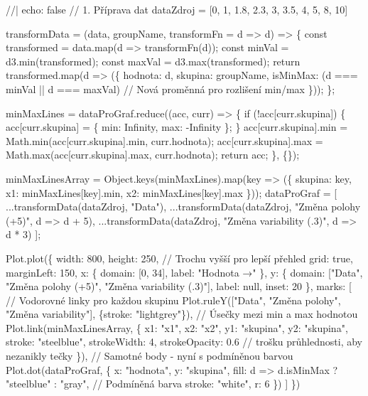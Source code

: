 \documentclass[
  czech,
  11pt,
  letterpaper,
  DIV=11,
  numbers=noendperiod]{scrreprt}
\newenvironment{Shaded}{\begin{snugshade}}{\end{snugshade}}
\newcommand{\NormalTok}[1]{\textcolor[rgb]{0.00,0.23,0.31}{#1}}
\begin{document}
\begin{Shaded}
\begin{Highlighting}[]
\NormalTok{//| echo: false}
\NormalTok{// 1. Příprava dat}
\NormalTok{dataZdroj = [0, 1, 1.8, 2.3, 3, 3.5, 4, 5, 8, 10]}

\NormalTok{transformData = (data, groupName, transformFn = d =\textgreater{} d) =\textgreater{} \{}
\NormalTok{  const transformed = data.map(d =\textgreater{} transformFn(d));}
\NormalTok{  const minVal = d3.min(transformed);}
\NormalTok{  const maxVal = d3.max(transformed);}
\NormalTok{  return transformed.map(d =\textgreater{} (\{ }
\NormalTok{    hodnota: d, }
\NormalTok{    skupina: groupName, }
\NormalTok{    isMinMax: (d === minVal || d === maxVal) // Nová proměnná pro rozlišení min/max}
\NormalTok{  \}));}
\NormalTok{\};}

\NormalTok{minMaxLines = dataProGraf.reduce((acc, curr) =\textgreater{} \{}
\NormalTok{  if (!acc[curr.skupina]) \{}
\NormalTok{    acc[curr.skupina] = \{ min: Infinity, max: {-}Infinity \};}
\NormalTok{  \}}
\NormalTok{  acc[curr.skupina].min = Math.min(acc[curr.skupina].min, curr.hodnota);}
\NormalTok{  acc[curr.skupina].max = Math.max(acc[curr.skupina].max, curr.hodnota);}
\NormalTok{  return acc;}
\NormalTok{\}, \{\});}

\NormalTok{minMaxLinesArray = Object.keys(minMaxLines).map(key =\textgreater{} (\{}
\NormalTok{  skupina: key,}
\NormalTok{  x1: minMaxLines[key].min,}
\NormalTok{  x2: minMaxLines[key].max}
\NormalTok{\}));}
\NormalTok{dataProGraf = [}
\NormalTok{  ...transformData(dataZdroj, "Data"),}
\NormalTok{  ...transformData(dataZdroj, "Změna polohy (+5)", d =\textgreater{} d + 5),}
\NormalTok{  ...transformData(dataZdroj, "Změna variability (.3)", d =\textgreater{} d * 3)}
\NormalTok{];}

\NormalTok{Plot.plot(\{}
\NormalTok{  width: 800,}
\NormalTok{  height: 250, // Trochu vyšší pro lepší přehled}
\NormalTok{  grid: true,}
\NormalTok{  marginLeft: 150, }
\NormalTok{  x: \{ domain: [0, 34], label: "Hodnota →" \},}
\NormalTok{  y: \{ }
\NormalTok{    domain: ["Data", "Změna polohy (+5)", "Změna variability (.3)"],}
\NormalTok{    label: null,}
\NormalTok{    inset: 20 }
\NormalTok{  \},  }
\NormalTok{  marks: [}
\NormalTok{    // Vodorovné linky pro každou skupinu}
\NormalTok{    Plot.ruleY(["Data", "Změna polohy", "Změna variability"], \{stroke: "lightgrey"\}),}
\NormalTok{    // Úsečky mezi min a max hodnotou}
\NormalTok{Plot.link(minMaxLinesArray, \{}
\NormalTok{      x1: "x1", }
\NormalTok{      x2: "x2", }
\NormalTok{      y1: "skupina", }
\NormalTok{      y2: "skupina", }
\NormalTok{      stroke: "steelblue", }
\NormalTok{      strokeWidth: 4,}
\NormalTok{      strokeOpacity: 0.6 // trošku průhlednosti, aby nezanikly tečky}
\NormalTok{    \}),}
\NormalTok{    // Samotné body {-} nyní s podmíněnou barvou}
\NormalTok{    Plot.dot(dataProGraf, \{}
\NormalTok{      x: "hodnota",}
\NormalTok{      y: "skupina",}
\NormalTok{      fill: d =\textgreater{} d.isMinMax ? "steelblue" : "gray", // Podmíněná barva}
\NormalTok{      stroke: "white",}
\NormalTok{      r: 6}
\NormalTok{    \})}
\NormalTok{  ]}
\NormalTok{\})}
\end{Highlighting}
\end{Shaded}
\end{document}
